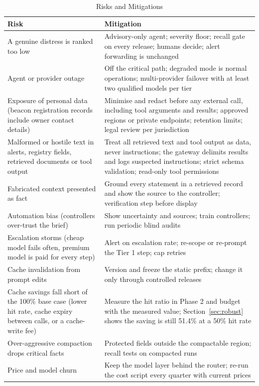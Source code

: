 \documentclass[conference]{IEEEtran}
\begin{document}
\begin{table}[!t]
\caption{Risks and Mitigations}
\label{tab:risks}
\centering
\footnotesize
\begin{tabularx}{\textwidth}{@{}Y Y@{}}
\toprule
\textbf{Risk} & \textbf{Mitigation} \\
\midrule
A genuine distress is ranked too low & Advisory-only agent; severity floor; recall gate on every release; humans decide; alert forwarding is unchanged \\
Agent or provider outage & Off the critical path; degraded mode is normal operations; multi-provider failover with at least two qualified models per tier \\
Exposure of personal data (beacon registration records include owner contact details) & Minimise and redact before any external call, including tool arguments and results; approved regions or private endpoints; retention limits; legal review per jurisdiction \\
Malformed or hostile text in alerts, registry fields, retrieved documents or tool output & Treat all retrieved text and tool output as data, never instructions; the gateway delimits results and logs suspected instructions; strict schema validation; read-only tool permissions \\
Fabricated context presented as fact & Ground every statement in a retrieved record and show the source to the controller; verification step before display \\
Automation bias (controllers over-trust the brief) & Show uncertainty and sources; train controllers; run periodic blind audits \\
Escalation storms (cheap model fails often, premium model is paid for every step) & Alert on escalation rate; re-scope or re-prompt the Tier 1 step; cap retries \\
Cache invalidation from prompt edits & Version and freeze the static prefix; change it only through controlled releases \\
Cache savings fall short of the 100\% base case (lower hit rate, cache expiry between calls, or a cache-write fee) & Measure the hit ratio in Phase 2 and budget with the measured value; Section~\ref{sec:robust} shows the saving is still 51.4\% at a 50\% hit rate \\
Over-aggressive compaction drops critical facts & Protected fields outside the compactable region; recall tests on compacted runs \\
Price and model churn & Keep the model layer behind the router; re-run the cost script every quarter with current prices \\

\end{tabularx}
\end{table}
\end{document}
